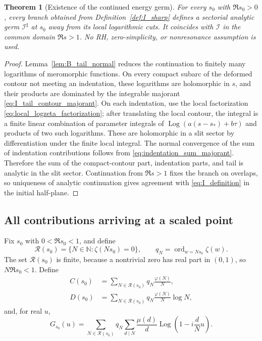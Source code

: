 \documentclass[11pt]{amsart}
\numberwithin{equation}{section}
\theoremstyle{plain}
\newtheorem{theorem}{Theorem}[section]
\theoremstyle{definition}
\theoremstyle{remark}
\newcommand{\Log}{\operatorname{Log}}
\begin{document}
\begin{theorem}[Existence of the continued energy germ]
\label{thm:I_continuation_exists}
For every \(s_0\) with \(\Re s_0>0\), every branch obtained from
Definition~\ref{def:I_sharp} defines a sectorial analytic germ
\(\mathcal I^\sharp\) at \(s_0\) away from its local logarithmic cuts.  It
coincides with \(\mathcal I\) in the common domain \(\Re s>1\).  No RH,
zero-simplicity, or nonresonance assumption is used.
\end{theorem}

\begin{proof}
Lemma~\ref{lem:B_tail_normal} reduces the continuation to finitely many
logarithms of meromorphic functions.  On every compact subarc of the deformed
contour not meeting an indentation, these logarithms are holomorphic in
\(s\), and their products are dominated by the integrable majorant
\eqref{eq:I_tail_contour_majorant}.  On each indentation, use the local
factorization \eqref{eq:local_logzeta_factorization}; after translating the
local contour, the integral is a finite linear combination of parameter
integrals of \(\Log(a(s-s_*)+b\tau)\) and products of two such logarithms.
These are holomorphic in a slit sector by differentiation under the finite
local integral.  The normal convergence of the sum of indentation
contributions follows from \eqref{eq:indentation_sum_majorant}.  Therefore the
sum of the compact-contour part, indentation parts, and tail is analytic in
the slit sector.  Continuation from \(\Re s>1\) fixes the branch on overlaps,
so uniqueness of analytic continuation gives agreement with
\eqref{eq:I_definition} in the initial half-plane.
\end{proof}

\subsection{All contributions arriving at a scaled point}
\label{subsec:all_replica_contributions}

Fix \(s_0\) with \(0<\Re s_0<1\), and define
\begin{equation}
\mathcal R(s_0)
=
\{N\in\mathbb N:\zeta(Ns_0)=0\},
\qquad
q_N=\operatorname{ord}_{w=Ns_0}\zeta(w).
\label{eq:Rset_qN}
\end{equation}
The set \(\mathcal R(s_0)\) is finite, because a nontrivial zero has real
part in \((0,1)\), so \(N\Re s_0<1\).
Define
\begin{align}
C(s_0)
&=
\sum_{N\in\mathcal R(s_0)}q_N\frac{\varphi(N)}N,
\label{eq:C_s0_definition}\\
D(s_0)
&=
\sum_{N\in\mathcal R(s_0)}q_N\frac{\varphi(N)}N\log N,
\label{eq:D_s0_definition}
\end{align}
and, for real \(u\),
\begin{equation}
G_{s_0}(u)
=
\sum_{N\in\mathcal R(s_0)}q_N
\sum_{d\mid N}\frac{\mu(d)}d
\Log\left(1-i\frac dN u\right).
\label{eq:G_s0_definition}
\end{equation}
\end{document}
